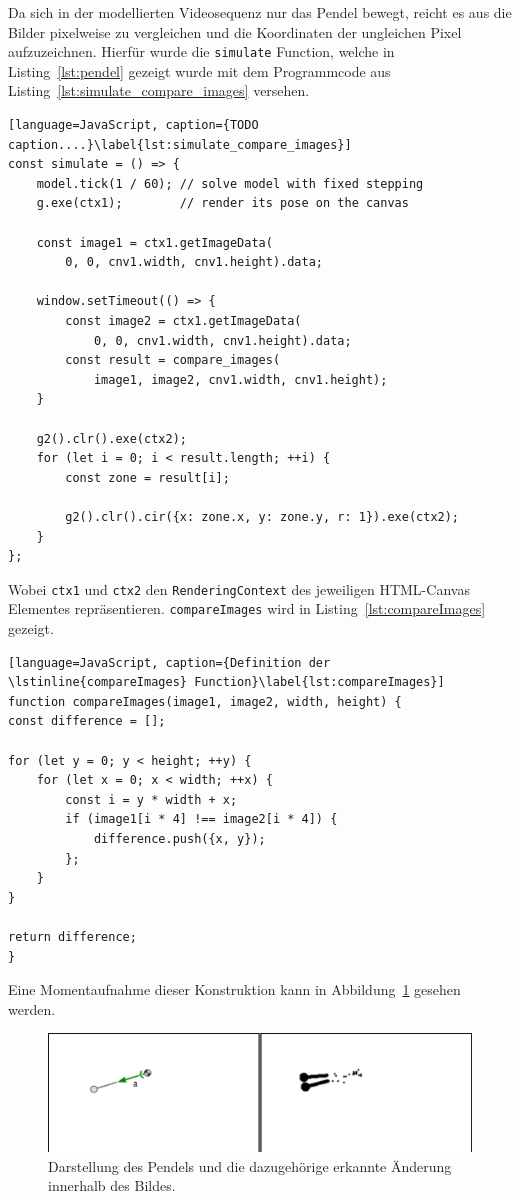 Da sich in der modellierten Videosequenz nur das Pendel bewegt, reicht es aus die Bilder pixelweise zu vergleichen und die Koordinaten der ungleichen Pixel aufzuzeichnen.
Hierfür wurde die \lstinline{simulate} Function, welche in Listing~\ref{lst:pendel} gezeigt wurde mit dem Programmcode aus Listing~\ref{lst:simulate_compare_images} versehen.

\begin{lstlisting}[language=JavaScript, caption={TODO caption....}\label{lst:simulate_compare_images}]
const simulate = () => {
    model.tick(1 / 60); // solve model with fixed stepping
    g.exe(ctx1);        // render its pose on the canvas

    const image1 = ctx1.getImageData(
        0, 0, cnv1.width, cnv1.height).data;

    window.setTimeout(() => {
        const image2 = ctx1.getImageData(
            0, 0, cnv1.width, cnv1.height).data;
        const result = compare_images(
            image1, image2, cnv1.width, cnv1.height);
    }

    g2().clr().exe(ctx2);
    for (let i = 0; i < result.length; ++i) {
        const zone = result[i];

        g2().clr().cir({x: zone.x, y: zone.y, r: 1}).exe(ctx2);
    }
};
\end{lstlisting}

Wobei \lstinline{ctx1} und \lstinline{ctx2} den \lstinline{RenderingContext} des jeweiligen HTML-Canvas Elementes repräsentieren.
\lstinline{compareImages} wird in Listing~\ref{lst:compareImages} gezeigt.

\begin{lstlisting}[language=JavaScript, caption={Definition der \lstinline{compareImages} Function}\label{lst:compareImages}]
function compareImages(image1, image2, width, height) {
const difference = [];

for (let y = 0; y < height; ++y) {
    for (let x = 0; x < width; ++x) {
        const i = y * width + x;
        if (image1[i * 4] !== image2[i * 4]) {
            difference.push({x, y});
        };
    }
}

return difference;
}
\end{lstlisting}

Eine Momentaufnahme dieser Konstruktion kann in Abbildung~\ref{fig:compareImages} gesehen werden.

\begin{figure}[htb]
    \includegraphics[width=\textwidth]{gfx/compare_images_1.png}
    \caption{Darstellung des Pendels und die dazugehörige erkannte Änderung innerhalb des Bildes.}
    \label{fig:compareImages}
\end{figure}

